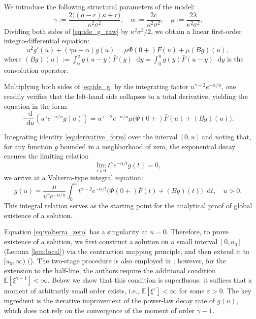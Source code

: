 \documentclass[smallextended]{svjour3}
\providecommand{\diff}{\mathop{}\!\mathrm{d}}
\begin{document}
We introduce the following structural parameters of the model:
\begin{equation*}%
\gamma := \frac{2\big((a-r)\kappa + r\big)}{\kappa^2\sigma^2}, \quad \alpha := \frac{2c}{\kappa^2\sigma^2}, \quad \mu := \frac{2\lambda}{\kappa^2\sigma^2}.
\end{equation*}
Dividing both sides of \eqref{eq:ide_g_raw} by $\kappa^2\sigma^2/2$, we obtain a linear first-order integro-differential equation:
\begin{equation}\label{eq:ide_g}
u^2 g'(u) + (\gamma u + \alpha) g(u) = \mu \Phi(0+) \bar{F}(u) + \mu (Bg)(u),
\end{equation}
where $(Bg)(u) := \int_0^u g(u-y) \bar{F}(y) \diff y = \int_0^u g(y) \bar{F}(u-y) \diff y$ is the convolution operator.

Multiplying both sides of \eqref{eq:ide_g} by the integrating factor $u^{\gamma-2} e^{-\alpha/u}$, one readily verifies that the left-hand side collapses to a total derivative, yielding the equation in the form:
\begin{equation}\label{eq:derivative_form}
\frac{\diff}{\diff u} \left( u^\gamma e^{-\alpha/u} g(u) \right) = u^{\gamma-2} e^{-\alpha/u} \mu \big( \Phi(0+) \bar{F}(u) + (Bg)(u) \big).
\end{equation}

Integrating identity \eqref{eq:derivative_form} over the interval $[0, u]$ and noting that, for any function $g$ bounded in a neighborhood of zero, the exponential decay ensures the limiting relation
\[
\lim_{t\downarrow 0} t^\gamma e^{-\alpha/t} g(t) = 0,
\]
we arrive at a Volterra-type integral equation:
\begin{equation}\label{eq:volterra_zero}
g(u) = \frac{\mu}{u^\gamma e^{-\alpha/u}} \int_0^u t^{\gamma-2} e^{-\alpha/t} \big( \Phi(0+) \bar{F}(t) + (Bg)(t) \big) \diff t, \quad u > 0.
\end{equation}
This integral relation serves as the starting point for the analytical proof of global existence of a solution.

\begin{remark}%
Equation \eqref{eq:volterra_zero} has a singularity at $u=0$. Therefore, to prove existence of a solution, we first construct a solution on a small interval $[0,u_0]$ (Lemma \ref{lem:local}) via the contraction mapping principle, and then extend it to $[u_0,\infty)$ (\cite[Theorem 2.1.1]{Burton1983}). The two-stage procedure is also employed in \cite{AK2026}; however, for the extension to the half-line, the authors require the additional condition $\mathbb{E}[\xi^{\gamma-1}]<\infty$. Below we show that this condition is superfluous: it suffices that a moment of arbitrarily small order exists, i.e., $\mathbb{E}[\xi^\varepsilon]<\infty$ for some $\varepsilon>0$. The key ingredient is the iterative improvement of the power-law decay rate of $g(u)$, which does not rely on the convergence of the moment of order $\gamma-1$.
\end{remark}
\end{document}
